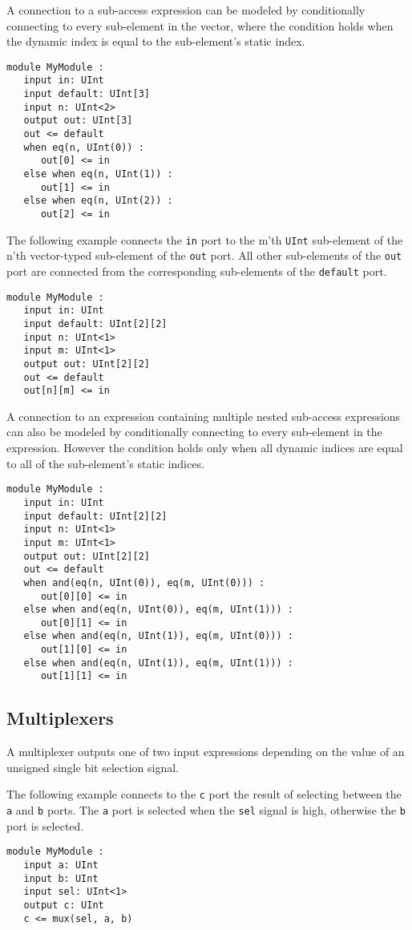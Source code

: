 \documentclass[12pt]{article}
\begin{document}
A connection to a sub-access expression can be modeled by conditionally connecting to every sub-element in the vector, where the condition holds when the dynamic index is equal to the sub-element's static index.
\begin{lstlisting}
module MyModule :
   input in: UInt
   input default: UInt[3]
   input n: UInt<2>
   output out: UInt[3]
   out <= default
   when eq(n, UInt(0)) :
      out[0] <= in
   else when eq(n, UInt(1)) :
      out[1] <= in
   else when eq(n, UInt(2)) :
      out[2] <= in
\end{lstlisting}

The following example connects the \verb|in| port to the m'th \verb|UInt| sub-element of the n'th vector-typed sub-element of the \verb|out| port. All other sub-elements of the \verb|out| port are connected from the corresponding sub-elements of the \verb|default| port.
\begin{lstlisting}
module MyModule :
   input in: UInt
   input default: UInt[2][2]
   input n: UInt<1>
   input m: UInt<1>
   output out: UInt[2][2]
   out <= default
   out[n][m] <= in
\end{lstlisting}

A connection to an expression containing multiple nested sub-access expressions can also be modeled by conditionally connecting to every sub-element in the expression. However the condition holds only when all dynamic indices are equal to all of the sub-element's static indices.
\begin{lstlisting}
module MyModule :
   input in: UInt
   input default: UInt[2][2]
   input n: UInt<1>
   input m: UInt<1>
   output out: UInt[2][2]
   out <= default
   when and(eq(n, UInt(0)), eq(m, UInt(0))) :
      out[0][0] <= in
   else when and(eq(n, UInt(0)), eq(m, UInt(1))) :
      out[0][1] <= in
   else when and(eq(n, UInt(1)), eq(m, UInt(0))) :
      out[1][0] <= in
   else when and(eq(n, UInt(1)), eq(m, UInt(1))) :
      out[1][1] <= in
\end{lstlisting}

\subsection{Multiplexers}\label{multiplexers}

A multiplexer outputs one of two input expressions depending on the value of an unsigned single bit selection signal.

The following example connects to the \verb|c| port the result of selecting between the \verb|a| and \verb|b| ports. The \verb|a| port is selected when the \verb|sel| signal is high, otherwise the \verb|b| port is selected.
\begin{lstlisting}
module MyModule :
   input a: UInt
   input b: UInt
   input sel: UInt<1>
   output c: UInt
   c <= mux(sel, a, b)
\end{lstlisting}
\end{document}
